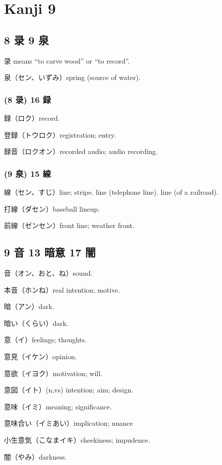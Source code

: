 \chapter{Kanji 9}

\section{8 录 9 泉}

录 means ``to carve wood'' or ``to record''.

泉（セン、いずみ）spring (source of water).

\subsection{(8 录) 16 録}

録（ロク）record.

登録（トウロク）registration; entry.

録音（ロクオン）recorded audio; audio recording.

\subsection{(9 泉) 15 線}

線（セン、すじ）line; stripe.
line (telephone line).
line (of a railroad).

打線（ダセン）baseball lineup.

前線（ゼンセン）front line; weather front.

\section{9 音 13 暗意 17 闇}

音（オン、おと、ね）sound.

本音（ホンね）real intention; motive.

暗（アン）dark.

暗い（くらい）dark.

意（イ）feelings; thoughts.

意見（イケン）opinion.

意欲（イヨク）motivation; will.

意図（イト）(n,vs) intention; aim; design.

意味（イミ）meaning; significance.

意味合い（イミあい）implication; nuance

小生意気（こなまイキ）cheekiness; impudence.

闇（やみ）darkness.

